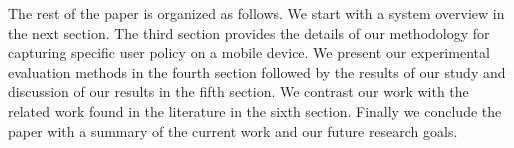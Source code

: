 The rest of the paper is organized as follows. We start with a system overview in the next section. The third section provides the details of our methodology for capturing specific user policy on a mobile device. We present our experimental evaluation methods in the fourth section followed by the results of our study and discussion of our results in the fifth section. We contrast our work with the related work found in the literature in the sixth section. Finally we conclude the paper with a summary of the current work and our future research goals.
